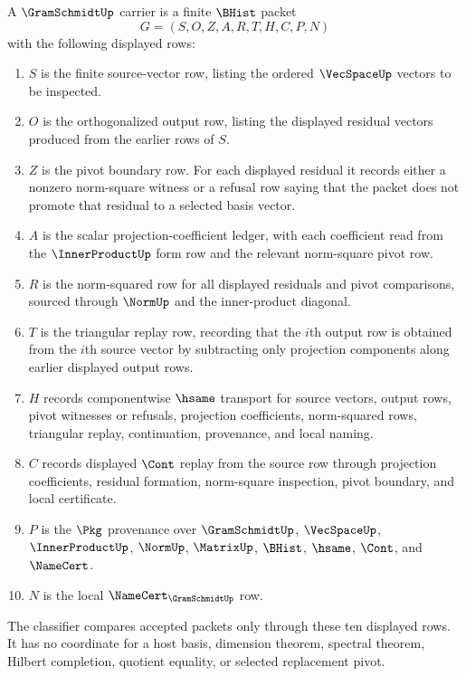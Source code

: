 \begin{definition}
\label{def:gram-schmidt-carrier}
A $\GramSchmidtUp$ carrier is a finite $\BHist$ packet
$$
G=(S,O,Z,A,R,T,H,C,P,N)
$$
with the following displayed rows:
\begin{enumerate}
\item $S$ is the finite source-vector row, listing the ordered $\VecSpaceUp$ vectors to be inspected.
\item $O$ is the orthogonalized output row, listing the displayed residual vectors produced from the earlier rows of $S$.
\item $Z$ is the pivot boundary row. For each displayed residual it records either a nonzero norm-square witness or a refusal row saying that the packet does not promote that residual to a selected basis vector.
\item $A$ is the scalar projection-coefficient ledger, with each coefficient read from the $\InnerProductUp$ form row and the relevant norm-square pivot row.
\item $R$ is the norm-squared row for all displayed residuals and pivot comparisons, sourced through $\NormUp$ and the inner-product diagonal.
\item $T$ is the triangular replay row, recording that the $i$th output row is obtained from the $i$th source vector by subtracting only projection components along earlier displayed output rows.
\item $H$ records componentwise $\hsame$ transport for source vectors, output rows, pivot witnesses or refusals, projection coefficients, norm-squared rows, triangular replay, continuation, provenance, and local naming.
\item $C$ records displayed $\Cont$ replay from the source row through projection coefficients, residual formation, norm-square inspection, pivot boundary, and local certificate.
\item $P$ is the $\Pkg$ provenance over $\GramSchmidtUp$, $\VecSpaceUp$, $\InnerProductUp$, $\NormUp$, $\MatrixUp$, $\BHist$, $\hsame$, $\Cont$, and $\NameCert$.
\item $N$ is the local $\NameCert_{\GramSchmidtUp}$ row.
\end{enumerate}
The classifier compares accepted packets only through these ten displayed rows. It has no coordinate for a host basis, dimension theorem, spectral theorem, Hilbert completion, quotient equality, or selected replacement pivot.
\end{definition}

